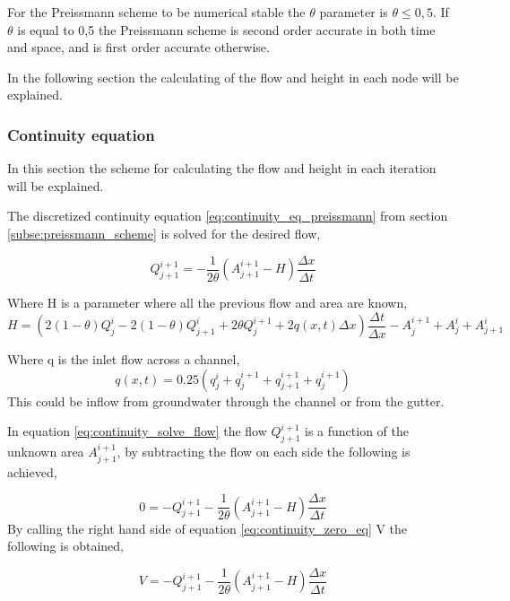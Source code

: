 For the Preissmann scheme to be numerical stable the $\theta$ parameter is $\theta \leq 0,5$. If $\theta$ is equal to 0,5 the Preissmann scheme is second order accurate in both time and space, and is first order accurate otherwise.   

In the following section the calculating of the flow and height in each node will be explained.

\subsubsection*{Continuity equation}
In this section the scheme for calculating the flow and height in each iteration will be explained. 

The discretized continuity equation \ref{eq:continuity_eq_preissmann} from section \ref{subse:preissmann_scheme} is solved for the desired flow,

\begin{equation}\label{eq:continuity_solve_flow}
	Q_{j+1}^{i+1} = - \frac{1}{2\theta}\left(A_{j+1}^{i+1}-H\right)\frac{\Delta x}{\Delta t}
\end{equation}

Where H is a parameter where all the previous flow and area are known,
\begin{equation}
	H = \left(2(1-\theta)Q_j^i-2(1-\theta)Q_{j+1}^i+2\theta Q_j^{i+1}+2q(x,t)\Delta x\right)\frac{\Delta t}{\Delta x}- A_{j}^{i+1}+A_j^i+A_{j+1}^i
\end{equation}

Where q is the inlet flow across a channel,
\begin{equation}
	q(x,t) = 0.25(q_j^i+q_j^{i+1}+q_{j+1}^{i+1}+q_j^{i+1})	
\end{equation}
This could be inflow from groundwater through the channel or from the gutter. 

In equation \ref{eq:continuity_solve_flow} the flow $Q_{j+1}^{i+1}$ is a function of the unknown area $A_{j+1}^{i+1}$, by subtracting the flow on each side the following is achieved, 

\begin{equation}\label{eq:continuity_zero_eq}
		0=-Q_{j+1}^{i+1}  - \frac{1}{2\theta}\left(A_{j+1}^{i+1}-H\right)\frac{\Delta x}{\Delta t}
\end{equation}
By calling the right hand side of equation \ref{eq:continuity_zero_eq} V the following is obtained,

\begin{equation}\label{eq:continuity_V}
		V=-Q_{j+1}^{i+1}  - \frac{1}{2\theta}\left(A_{j+1}^{i+1}-H\right)\frac{\Delta x}{\Delta t}
\end{equation}

